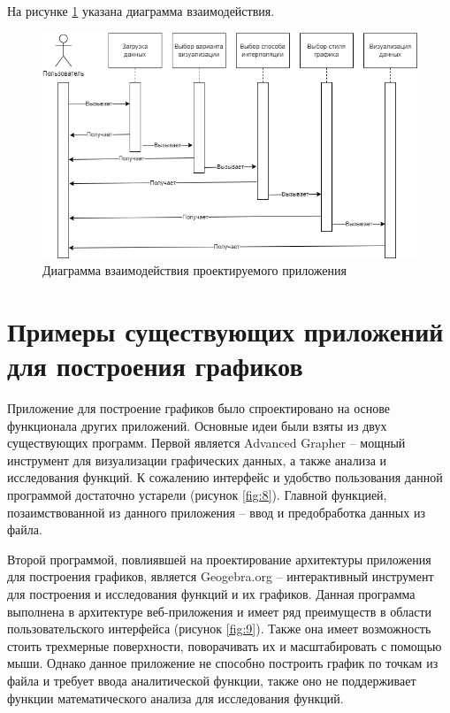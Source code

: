 На рисунке \ref{fig:7} указана диаграмма взаимодействия.

\begin{figure}[h!]
    \center
    \includegraphics[scale=0.60]{fig/vzaim.png}
    \caption{Диаграмма взаимодействия проектируемого приложения}
    \label{fig:7}
\end{figure}

\newpage
\section{Примеры существующих приложений для построения графиков}

Приложение для построение графиков было спроектировано на основе функционала других приложений. Основные идеи были взяты из двух существующих программ. Первой является Advanced Grapher -- мощный инструмент для визуализации графических данных, а также анализа и исследования функций. К сожалению интерфейс и удобство пользования данной программой достаточно устарели (рисунок \ref{fig:8}). Главной функцией, позаимствованной из данного приложения -- ввод и предобработка данных из файла.

Второй программой, повлиявшей на проектирование архитектуры приложения для построения графиков, является Geogebra.org -- интерактивный инструмент для построения и исследования функций и их графиков. Данная программа выполнена в архитектуре веб-приложения и имеет ряд преимуществ в области пользовательского интерфейса (рисунок \ref{fig:9}). Также она имеет возможность стоить трехмерные поверхности, поворачивать их и масштабировать с помощью мыши. Однако данное приложение не способно построить график по точкам из файла и требует ввода аналитической функции, также оно не поддерживает функции математического анализа для исследования функций.

